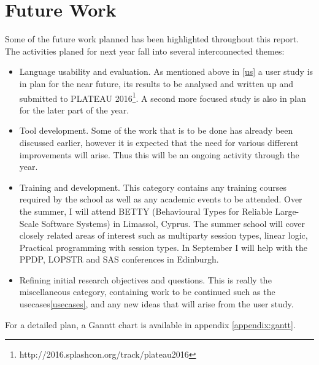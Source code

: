 \section{Future Work}
\label{sec:future}

Some of the future work planned has been highlighted throughout this report. The activities planed for next year fall into several interconnected themes:
\begin{itemize}
\item Language usability and evaluation. As mentioned above in \ref{us} a user study is in plan for the near future, its results to be analysed and written up and submitted to PLATEAU 2016\footnote{http://2016.splashcon.org/track/plateau2016}. A second more focused study is also in plan for the later part of the year. 
\item Tool development. Some of the work that is to be done has already been discussed earlier, however it is expected that the need for various different improvements will arise. Thus this will be an ongoing activity through the year. 
\item Training and development. This category contains any training courses required by the school as well as any academic events to be attended. Over the summer, I will attend BETTY (Behavioural Types for Reliable Large-Scale Software Systems) in Limassol, Cyprus. The summer school will cover closely related areas of interest such as multiparty session types, linear logic, Practical programming with session types. In September I will help with the PPDP, LOPSTR and SAS conferences in Edinburgh.
\item Refining initial research objectives and questions. This is really the miscellaneous category, containing work to be continued such as the usecases\ref{usecases}, and any new ideas that will arise from the user study.
\end{itemize}

For a detailed plan, a Ganntt chart is available in appendix \ref{appendix:gantt}.
